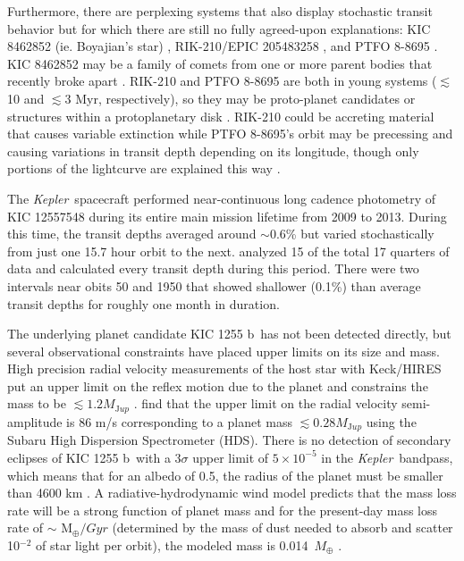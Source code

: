 \documentclass[preprint,trackchanges]{aastex61}
\newcommand{\sha}{KIC 1255 b}
\newcommand{\kepler}{{\it Kepler}}
\begin{document}
Furthermore, there are perplexing systems that also display stochastic transit behavior but for which there are still no fully agreed-upon explanations: KIC 8462852 (ie. Boyajian's star) \citep{boyajian846}, RIK-210/EPIC 205483258 \citep{david2017rik210},  and PTFO 8-8695 \citep{vanEyken2012ptfTTauri}.
KIC 8462852 may be a family of comets from one or more parent bodies that recently broke apart \citep{boyajian846,bodman2016kic8462852cometFamily,wright2016familiesOfSolutions}.
RIK-210 and PTFO 8-8695 are both in young systems ($\lesssim$ 10 and $\lesssim$3 Myr, respectively), so they may be proto-planet candidates or structures within a protoplanetary disk \citep{stauffer2017orbitingClouds,yu2015ptfO8d8695PlanetHypothesisTest}.
RIK-210 could be accreting material that causes variable extinction while PTFO 8-8695's orbit may be precessing and causing variations in transit depth depending on its longitude, though only portions of the lightcurve are explained this way \citep{barnes2013PTFO8d8695NodalPrecession,yu2015ptfO8d8695PlanetHypothesisTest}.

The \kepler\ spacecraft performed near-continuous long cadence photometry of KIC 12557548 during its entire main mission lifetime from 2009 to 2013.
During this time, the transit depths averaged around $\sim$0.6\% but varied stochastically from just one 15.7 hour orbit to the next.
\citet{vanWerkhoven2014} analyzed 15 of the total 17 quarters of data and calculated every transit depth during this period.
There were two intervals near obits 50 and 1950 that showed shallower (0.1\%) than average transit depths for roughly one month in duration.

The underlying planet candidate \sha\ has not been detected directly, but several observational constraints have placed upper limits on its size and mass.
High precision radial velocity measurements of the host star with Keck/HIRES put an upper limit on the reflex motion due to the planet and constrains the mass to be $\lesssim 1.2 M_{\mathrm Jup}$ \citep{croll2014}.
\citet{masuda2018rvKIC1255} find that the upper limit on the radial velocity semi-amplitude is 86 m/s corresponding to a planet mass $\lesssim 0.28 M_{\mathrm Jup}$ using the Subaru High Dispersion Spectrometer (HDS).
There is no detection of secondary eclipses of \sha\ with a 3$\sigma$ upper limit of $5 \times 10^{-5}$ in the \kepler\ bandpass, which means that for an albedo of 0.5, the radius of the planet must be smaller than 4600 km \citep{vanWerkhoven2014}.
A radiative-hydrodynamic wind model predicts that the mass loss rate will be a strong function of planet mass and for the present-day mass loss rate of $\sim$ M$_\oplus/Gyr$ (determined by the mass of dust needed to absorb and scatter 10$^{-2}$ of star light per orbit), the modeled mass is 0.014~$M_\oplus$ \citep{perez-becker}.
\end{document}
